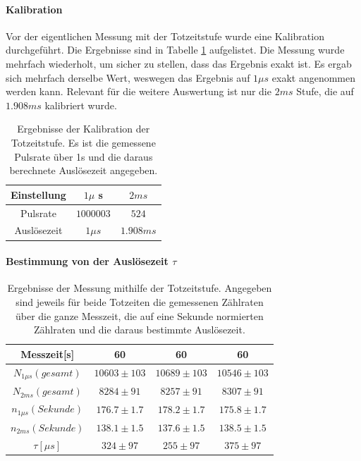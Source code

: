 \documentclass[12pt,a4paper]{article}
\begin{document}
\paragraph{Kalibration}
Vor der eigentlichen Messung mit der Totzeitstufe wurde eine Kalibration durchgeführt. Die Ergebnisse sind in Tabelle \ref{tab:Totzeitkalibration} aufgelistet. Die Messung wurde mehrfach wiederholt, um sicher zu stellen, dass das Ergebnis exakt ist. Es ergab sich mehrfach derselbe Wert, weswegen das Ergebnis auf $1\mu s$ exakt angenommen werden kann. Relevant für die weitere Auswertung ist nur die $2ms$ Stufe, die auf $1.908ms$ kalibriert wurde.

\begin{table}
\centering
\begin{tabular}{|c|c||c|}
\hline
Einstellung & $1\mu$ s & $2ms$\\
\hline 
Pulsrate & $1000003$ & $524$ \\
\hline 
Auslösezeit & $1\mu s$ & $1.908ms$ \\
\hline
\end{tabular}
\caption{Ergebnisse der Kalibration der Totzeitstufe. Es ist die gemessene Pulsrate über 1s und die daraus berechnete Auslösezeit angegeben.}
\label{tab:Totzeitkalibration}
\end{table}

\paragraph{Bestimmung von der Auslösezeit $\tau$}

\begin{table}
\centering
\begin{tabular}{|c|c|c|c|}
\hline
Messzeit[s] & 60 &60&60\\
\hline 
$N_{1\mu s}(gesamt)$ & $10603 \pm 103$ & $10689\pm 103$ & $10546\pm 103$ \\
\hline 
$N_{2ms}(gesamt)$ & $8284\pm 91$ & $8257 \pm 91$ & $8307\pm 91$ \\
\hline 
$n_{1\mu s}(Sekunde)$ & $176.7 \pm 1.7$ & $178.2 \pm 1.7$ & $175.8\pm 1.7$ \\
\hline 
$n_{2ms}(Sekunde)$ & $138.1\pm 1.5$ & $137.6 \pm 1.5$ & $138.5\pm 1.5$ \\
\hline 
$\tau [\mu s]$ & $324\pm 97 $ & $255 \pm 97$ & $375\pm 97$ \\
\hline
\end{tabular}
\caption{Ergebnisse der Messung mithilfe der Totzeitstufe. Angegeben sind jeweils für beide Totzeiten die gemessenen Zählraten über die ganze Messzeit, die auf eine Sekunde normierten Zählraten und die daraus bestimmte Auslösezeit.}
\label{tab:Totzeitstufe}
\end{table}
\end{document}
